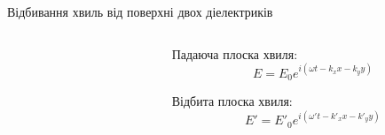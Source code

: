 \documentclass[onlytextwidth]{beamer}
\begin{document}
\begin{frame}[t]{Відбивання хвиль від поверхні двох діелектриків}
\begin{columns}
\begin{column}{0.5\linewidth}
\begin{center}

			\end{center}
		\end{column}
		\begin{column}{0.5\linewidth}
			\only<1-4>
			{
				\begin{block}{}
					Падаюча плоска хвиля:
					\begin{equation*}
						E = E_0 e^{i(\omega t - k_xx - k_yy)}
					\end{equation*}

					Відбита плоска хвиля:
					\begin{equation*}
						E' = E'_0 e^{i(\omega' t - k'_xx-k'_yy)}
					\end{equation*}


\end{block}}
\end{column}
\end{columns}
\end{frame}
\end{document}
